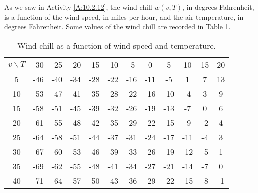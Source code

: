 \begin{activity} \label{A:10.3.6}  As we saw in Activity
  \ref{A:10.2.12}, the wind chill $w(v,T)$, in degrees Fahrenheit, is
  a function of the
  wind speed, in miles per hour, and the air temperature, in degrees Fahrenheit.  Some values of the wind chill are
  recorded in Table \ref{T:10.2.wind.chill}.

\begin{table}[ht] 
  \begin{center}
    \begin{tabular}{|c||c|c|c|c|c|c|c|c|c|c|c|}
      \hline
      $v \backslash T$  
         &-30  &-25 &-20 &-15 &-10 &-5  &0   &5   &10  &15  &20  \\
      \hhline{|=|=|=|=|=|=|=|=|=|=|=|=|}
      5  &-46	&-40 &-34 &-28 &-22 &-16 &-11 &-5 &1 &7 &13  \\
      \hline
      10 &-53	&-47 &-41 &-35 &-28 &-22 &-16 &-10 &-4 &3 &9   \\
      \hline
      15 &-58	&-51 &-45 &-39 &-32 &-26 &-19 &-13 &-7 &0 &6  \\
      \hline
      20 &-61	&-55 &-48 &-42 &-35 &-29 &-22 &-15 &-9 &-2 &4  \\
      \hline
      25 &-64	&-58 &-51 &-44 &-37 &-31 &-24 &-17 &-11 &-4 &3 \\
      \hline
      30 &-67	&-60 &-53 &-46 &-39 &-33 &-26 &-19 &-12 &-5 &1 \\
      \hline
      35 &-69	&-62 &-55 &-48 &-41 &-34 &-27 &-21 &-14 &-7 &0 \\
      \hline
      40 &-71	&-64 &-57 &-50 &-43 &-36 &-29 &-22 &-15 &-8 &-1 \\
      \hline
    \end{tabular}
    \caption{Wind chill as a function of wind speed and temperature.}
    \label{T:10.2.wind.chill}
  \end{center}
\end{table}

\end{activity}
